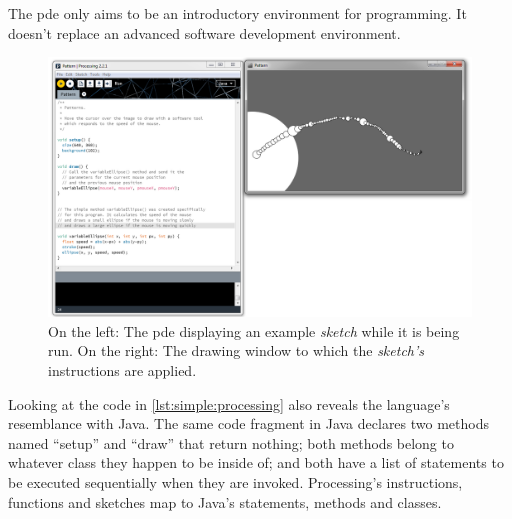 \documentclass{./llncs2e/llncs}
\begin{document}
	The \ac{pde} only aims to be an introductory environment for programming. 
	It doesn't replace an advanced software development environment.

	\begin{figure}
	  \centering
	  \includegraphics[width=1.0\textwidth]{img/proc_dev_env}
	    \caption{On the left: The \ac{pde} displaying an example \emph{sketch} while it is being run. On the right: The drawing window to which the \emph{sketch's} instructions are applied.}
	  \label{fig:proc:dev:env}
	\end{figure} 

	Looking at the code in \ref{lst:simple:processing} also reveals the language's resemblance with Java. 
	The same code fragment in Java declares two methods named ``setup'' and ``draw'' that return nothing; both methods belong to whatever class they happen to be inside of; and both have a list of statements to be executed sequentially when they are invoked. 
	Processing's instructions, functions and sketches map to Java's statements, methods and classes.

\end{document}
